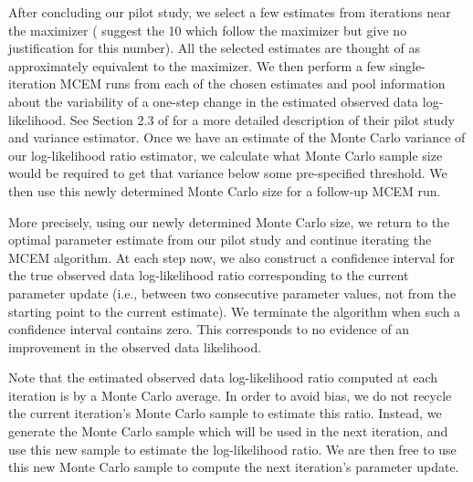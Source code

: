 \documentclass[11pt, oneside]{article}   	%
\begin{document}
After concluding our pilot study, we select a few estimates from iterations near the maximizer (\citeauthor{Cha95} suggest the 10 which follow the maximizer but give no justification for this number). All the selected estimates are thought of as approximately equivalent to the maximizer. We then perform a few single-iteration MCEM runs from each of the chosen estimates and pool information about the variability of a one-step change in the estimated observed data log-likelihood. See Section 2.3 of \citet{Cha95} for a more detailed description of their pilot study and variance estimator. Once we have an estimate of the Monte Carlo variance of our log-likelihood ratio estimator, we calculate what Monte Carlo sample size would be required to get that variance below some pre-specified threshold\footnotemark. We then use this newly determined Monte Carlo size for a follow-up MCEM run.



More precisely, using our newly determined Monte Carlo size, we return to the optimal parameter estimate from our pilot study and continue iterating the MCEM algorithm. At each step now, we also construct a confidence interval for the true observed data log-likelihood ratio corresponding to the current parameter update (i.e., between two consecutive parameter values, not from the starting point to the current estimate). We terminate the algorithm when such a confidence interval contains zero. This corresponds to no evidence of an improvement in the observed data likelihood.


Note that the estimated observed data log-likelihood ratio computed at each iteration is by a Monte Carlo average. In order to avoid bias, we do not recycle the current iteration's Monte Carlo sample to estimate this ratio. Instead, we generate the Monte Carlo sample which will be used in the next iteration, and use this new sample to estimate the log-likelihood ratio\footnotemark. We are then free to use this new Monte Carlo sample to compute the next iteration's parameter update. 

\end{document}
